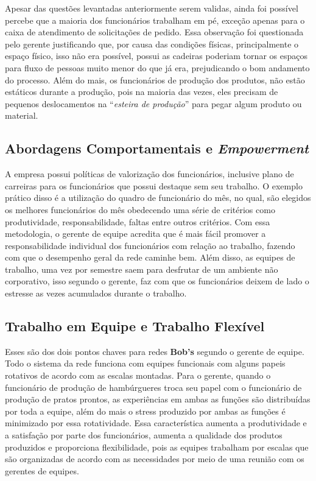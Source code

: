 			Apesar das questões levantadas anteriormente serem validas, ainda foi possível percebe que a maioria dos funcionários trabalham em pé, exceção apenas para o caixa de atendimento de solicitações de pedido. Essa observação foi questionada pelo gerente justificando que, por causa das condições físicas, principalmente o espaço físico, isso não era possível, possui as cadeiras poderiam tornar os espaços para fluxo de pessoas muito menor do que já era, prejudicando o bom andamento do processo. Além do mais, os funcionários de produção dos produtos, não estão estáticos durante a produção, pois na maioria das vezes, eles precisam de pequenos deslocamentos na “\emph{esteira de produção}” para pegar algum produto ou material.

		\subsection[Abordagens Comportamentais e Empowerment]{Abordagens Comportamentais e \emph{Empowerment}}
		\label{sec:organizacao_ace}

			A empresa possui políticas de valorização dos funcionários, inclusive plano de carreiras para os funcionários que possui destaque sem seu trabalho. O exemplo prático disso é a utilização do quadro de funcionário do mês, no qual, são elegidos os melhores funcionários do mês obedecendo uma série de critérios como produtividade, responsabilidade, faltas entre outros critérios. Com essa metodologia, o gerente de equipe acredita que é mais fácil promover a responsabilidade individual dos funcionários com relação ao trabalho, fazendo com que o desempenho geral da rede caminhe bem. Além disso, as equipes de trabalho, uma vez por semestre saem para desfrutar de um ambiente não corporativo, isso segundo o gerente, faz com que os funcionários deixem de lado o estresse as vezes acumulados durante o trabalho. \cite{junior}

		\subsection[Trabalho em Equipe e Trabalho Flexível]{Trabalho em Equipe e Trabalho Flexível}
		\label{sec:tecnologias_tetf}

			Esses são dos dois pontos chaves para redes \textbf{Bob’s} segundo o gerente de equipe. Todo o sistema da rede funciona com equipes funcionais com alguns papeis rotativos de acordo com as escalas montadas. Para o gerente, quando o funcionário de produção de hambúrgueres troca seu papel com o funcionário de produção de pratos prontos, as experiências em ambas as funções são distribuídas por toda a equipe, além do mais o stress produzido por ambas as funções é minimizado por essa rotatividade. Essa característica aumenta a produtividade e a satisfação por parte dos funcionários, aumenta a qualidade dos produtos produzidos e proporciona flexibilidade, pois as equipes trabalham por escalas que são organizadas de acordo com as necessidades por meio de uma reunião com os gerentes de equipes. 
